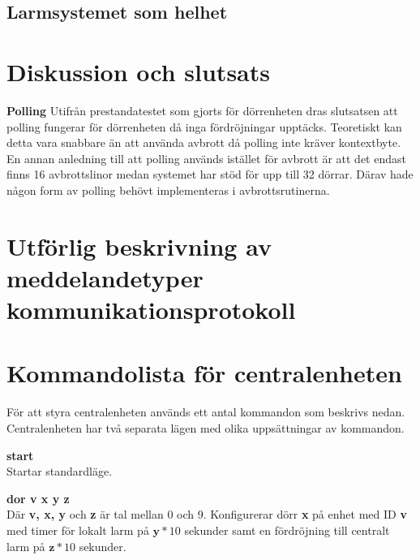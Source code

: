 \documentclass{article}
\begin{document}
 \subsection{Larmsystemet som helhet}
\section{Diskussion och slutsats}
\textbf{Polling} Utifrån prestandatestet som gjorts för dörrenheten dras slutsatsen att polling fungerar för dörrenheten då inga fördröjningar upptäcks. Teoretiskt kan detta vara snabbare än att använda avbrott då polling inte kräver kontextbyte. En annan anledning till
att polling används istället för avbrott är att det endast finns 16 avbrottslinor medan systemet har stöd för upp till 32 dörrar. Därav hade någon form av polling behövt implementeras i avbrottsrutinerna.






\appendix
    \section{Utförlig beskrivning av meddelandetyper kommunikationsprotokoll}
    \label{bilaga:protokoll}
        

    \section{Kommandolista för centralenheten}
    \label{kommandon}
        För att styra centralenheten används ett antal kommandon som beskrivs nedan. Centralenheten har två separata lägen med olika uppsättningar av kommandon.

    \textbf{start}\\
    Startar standardläge.

    \textbf{dor v x y z}\\
    Där \textbf{v, x, y} och \textbf{z} är tal mellan 0 och 9. Konfigurerar dörr \textbf{x} på enhet med ID \textbf{v} med timer för lokalt larm på  \(\textbf{y} * 10\) sekunder samt en fördröjning till centralt larm på \(\textbf{z} * 10\) sekunder.
\end{document}
